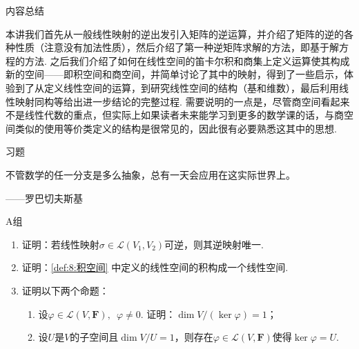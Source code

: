 \vspace{2ex}
\centerline{\heiti \Large 内容总结}

本讲我们首先从一般线性映射的逆出发引入矩阵的逆运算，并介绍了矩阵的逆的各种性质（注意没有加法性质），然后介绍了第一种逆矩阵求解的方法，即基于解方程的方法. 之后我们介绍了如何在线性空间的笛卡尔积和商集上定义运算使其构成新的空间——即积空间和商空间，并简单讨论了其中的映射，得到了一些启示，体验到了从定义线性空间的运算，到研究线性空间的结构（基和维数），最后利用线性映射同构等给出进一步结论的完整过程. 需要说明的一点是，尽管商空间看起来不是线性代数的重点，但实际上如果读者未来能学习到更多的数学课的话，与商空间类似的使用等价类定义的结构是很常见的，因此很有必要熟悉这其中的思想.

\vspace{2ex}
\centerline{\heiti \Large 习题}

\vspace{2ex}
{\kaishu 不管数学的任一分支是多么抽象，总有一天会应用在这实际世界上。}
\begin{flushright}
    \kaishu
    ——罗巴切夫斯基
\end{flushright}

\centerline{\heiti A组}
\begin{enumerate}
    \item 证明：若线性映射$\sigma \in \mathcal{L}(V_1,V_2)$可逆，则其逆映射唯一.

    \item 证明：\autoref{def:8:积空间} 中定义的线性空间的积构成一个线性空间.

    \item 证明以下两个命题：
          \begin{enumerate}
              \item 设$\varphi\in \mathcal{L}(V,\mathbf{F}),\enspace\varphi\neq 0$. 证明：$\dim V/(\ker\varphi)=1$；

              \item 设$U$是$V$的子空间且$\dim V/U=1$，则存在$\varphi\in \mathcal{L}(V,\mathbf{F})$使得$\ker\varphi=U$.
          \end{enumerate}
\end{enumerate}

